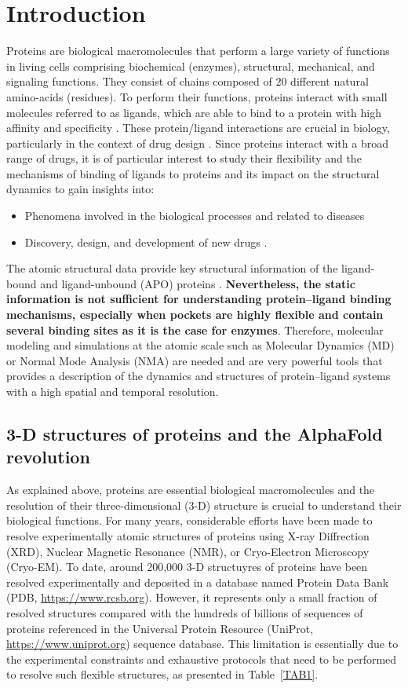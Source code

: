 \chapter{Introduction}
Proteins are biological macromolecules that perform a large variety of functions in living cells comprising biochemical (enzymes), structural, mechanical, and signaling functions. They consist of chains composed of 20 different natural amino-acids (residues). To perform their functions, proteins interact with small molecules referred to as ligands, which are able to bind to a protein with high affinity and specificity \cite{du2016insights}. These protein/ligand interactions are crucial in biology, particularly in the context of drug design \cite{li2019predicting}. Since proteins interact with a broad range of drugs, it is of particular interest to study their flexibility and the mechanisms of binding of ligands to proteins and its impact on the structural dynamics to gain insights into:
\begin{itemize}
	\item Phenomena involved in the biological processes and related to diseases \cite{silva2010ligand}
	\item Discovery, design, and development of new drugs \cite{payandeh2021ligand}.
\end{itemize}
The atomic structural data provide key structural information of the ligand-bound and ligand-unbound (APO) proteins \cite{chakraborti2021all}. \textbf{Nevertheless, the static information is not sufficient for understanding protein–ligand binding mechanisms, especially when pockets are highly flexible and contain several binding sites as it is the case for enzymes}. Therefore, molecular modeling and simulations at the atomic scale such as Molecular Dynamics (MD) or Normal Mode Analysis (NMA) are needed and are very powerful tools that provides a description of the dynamics and structures of protein–ligand systems with a high spatial and temporal resolution.

\section{3-D structures of proteins and the AlphaFold revolution}

As explained above, proteins are essential biological macromolecules and the resolution of their three-dimensional (3-D) structure is crucial to understand their biological functions. For many years, considerable efforts have been made to resolve experimentally atomic structures of proteins using X-ray Diffrection (XRD), Nuclear Magnetic Resonance (NMR), or Cryo-Electron Microscopy (Cryo-EM). To date, around 200,000 3-D structuyres of proteins have been resolved experimentally and deposited in a database named Protein Data Bank (PDB, \url{https://www.rcsb.org}). However, it represents only a small fraction of resolved structures compared with the hundreds of billions of sequences of proteins referenced in the Universal Protein Resource (UniProt, \url{https://www.uniprot.org}) sequence database. This limitation is essentially due to the experimental constraints and exhaustive protocols that need to be performed to resolve such flexible structures, as presented in Table~\ref{TAB1}.

